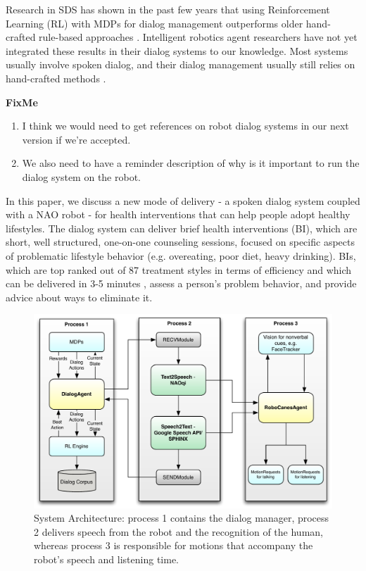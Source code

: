 \documentclass[letterpaper]{article}
\begin{document}
Research in SDS has shown in the past few years that using Reinforcement Learning (RL) with MDPs for dialog management outperforms older hand-crafted rule-based approaches \cite{frampton2009,young2013pomdp}. Intelligent robotics agent researchers have not yet integrated these results in their dialog systems to our knowledge. Most systems usually involve spoken dialog, and their dialog management usually still relies on hand-crafted methods \cite{morbiniFlores2012,Bickmore2010}. 

{\color{red}
\textbf{FixMe}
\begin{enumerate}
 \item I think we would need to get references on robot dialog systems in our next version 
if we're accepted.
 \item We also need to have a reminder description of why is it important to run the dialog system 
on the robot.  
\end{enumerate}
}

In this paper, we discuss a new mode of delivery - a spoken dialog system coupled with a NAO robot - for health interventions that can help people adopt healthy lifestyles.  The dialog system can deliver brief health interventions (BI), which are short, well structured, one-on-one counseling sessions, focused on specific aspects of problematic lifestyle behavior (e.g. overeating, poor diet, heavy drinking). BIs, which are top ranked out of 87 treatment styles in terms of efficiency \cite{miller2002mesa} and which can be delivered in 3-5 minutes \cite{Moyer2002}, assess a person's problem behavior, and provide advice about ways to eliminate it. 

\begin{figure}[!t] 
\centering 
\includegraphics[width=.45\textwidth]{figures/system} 
\caption{System Architecture: process 1 contains the dialog manager, process 2 delivers speech from the robot and
the recognition of the human, whereas process 3 is responsible for motions that accompany the robot's
speech and listening time.} 
\label{fig:system} 
\end{figure}
\end{document}

